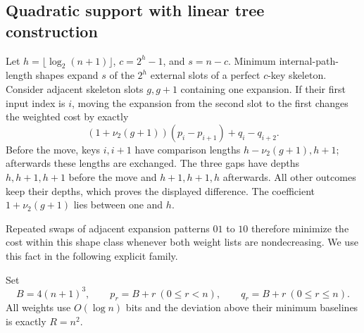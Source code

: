 \documentclass[11pt]{article}
\begin{document}
\subsection{Quadratic support with linear tree construction}
\label{sec:ruler}
Let $h=\lfloor\log_2(n+1)\rfloor$, $c=2^h-1$, and $s=n-c$.
Minimum internal-path-length shapes expand $s$ of the
$2^h$ external slots of a perfect $c$-key skeleton. Consider adjacent
skeleton slots $g,g+1$ containing one expansion. If their first input
index is $i$, moving the expansion from the second slot to the first
changes the weighted cost by exactly
\begin{equation}\label{eq:ruler-exchange}
 (1+\nu_2(g+1))(p_i-p_{i+1})+q_i-q_{i+2}.
\end{equation}
Before the move, keys $i,i+1$ have comparison lengths
$h-\nu_2(g+1),h+1$; afterwards these lengths are exchanged.
The three gaps have depths $h,h+1,h+1$ before the move and
$h+1,h+1,h$ afterwards. All other outcomes keep their depths,
which proves the displayed difference. The coefficient
$1+\nu_2(g+1)$ lies between one and $h$.


Repeated swaps of adjacent expansion patterns $01$ to $10$ therefore
minimize the cost within this shape class whenever both weight lists are
nondecreasing. We use this fact in the following explicit family.

Set
\begin{equation}\label{eq:ruler-family}
 B=4(n+1)^3,\qquad p_r=B+r\ (0\le r<n),\qquad
 q_r=B+r\ (0\le r\le n).
\end{equation}
All weights use $O(\log n)$ bits and the deviation above their minimum
baselines is exactly $R=n^2$.
\end{document}
